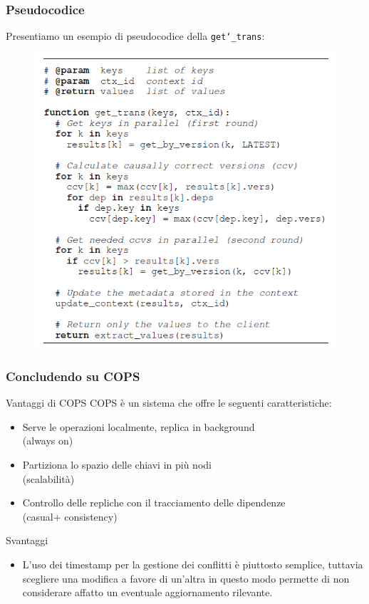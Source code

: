 \begin{frame}
\frametitle{Pseudocodice}
Presentiamo un esempio di pseudocodice della \texttt{get\char`_trans}:
\begin{figure}
	\centering
	\includegraphics[scale=0.40]{COPS/COPS5.png}
\end{figure}
\end{frame}

\begin{frame}
\frametitle{Concludendo su COPS}
\begin{block}{Vantaggi di COPS}
COPS è un sistema che offre le seguenti caratteristiche:
	\begin{itemize}
		\item<1-> Serve le operazioni localmente, replica in background \\
				  (always on)
		\item<1-> Partiziona lo spazio delle chiavi in più nodi \\
				  (scalabilità)
		\item<1-> Controllo delle repliche con il tracciamento delle dipendenze \\
				  (casual+ consistency)
	\end{itemize}
\end{block}
\begin{block}{Svantaggi}
	\begin{itemize}
		\item L'uso dei timestamp per la gestione dei conflitti è piuttosto semplice,
			  tuttavia scegliere una modifica a favore di un'altra in questo modo
			  permette di non considerare affatto un eventuale aggiornamento rilevante.
	\end{itemize}
\end{block}
\end{frame}
